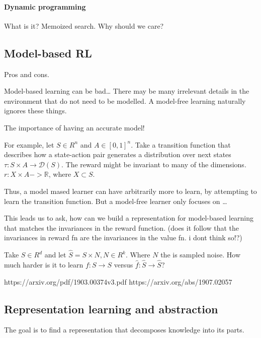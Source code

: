 \hypertarget{dynamic-programming}{%
\paragraph{Dynamic programming}\label{dynamic-programming}}

What is it? Memoized search. Why should we care?

\hypertarget{model-based-rl}{%
\subsection{Model-based RL}\label{model-based-rl}}

Pros and cons.

Model-based learning can be bad\ldots{} There may be many irrelevant
details in the environment that do not need to be modelled. A model-free
learning naturally ignores these things.

The importance of having an accurate model!

For example, let \(S\in R^n\) and \(A\in [0, 1]^n\). Take a transition
function that describes how a state-action pair generates a distribution
over next states \(\tau: S \times A \to \mathcal D(S)\). The reward
might be invariant to many of the dimensions.
\(r: X \times A -> \mathbb R\), where \(X \subset S\).

Thus, a model mased learner can have arbitrarily more to learn, by
attempting to learn the transition function. But a model-free learner
only focuses on \ldots{}

This leads us to ask, how can we build a representation for model-based
learning that matches the invariances in the reward function. (does it
follow that the invariances in reward fn are the invariances in the
value fn. i dont think so!?)

Take \(S \in R^d\) and let \(\hat S = S \times N, N \in R^k\). Where
\(N\) the is sampled noise. How much harder is it to learn
\(f: S \to S\) versus \(\hat f: \hat S \to \hat S\)?

https://arxiv.org/pdf/1903.00374v3.pdf https://arxiv.org/abs/1907.02057

\hypertarget{representation-learning-and-abstraction}{%
\subsection{Representation learning and
abstraction}\label{representation-learning-and-abstraction}}

The goal is to find a representation that decomposes knowledge into its
parts.

